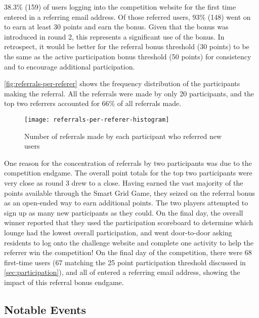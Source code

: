 38.3\% (159) of users logging into the competition website for the first time entered in a referring email address. Of those referred users, 93\% (148) went on to earn at least 30 points and earn the bonus. Given that the bonus was introduced in round 2, this represents a significant use of the bonus. In retrospect, it would be better for the referral bonus threshold (30 points) to be the same as the active participation bonus threshold (50 points) for consistency and to encourage additional participation.

\autoref{fig:referrals-per-referer} shows the frequency distribution of the participants making the referral. All the referrals were made by only 20 participants, and the top two referrers accounted for 66\% of all referrals made.

\begin{figure}[htbp]
	\centering
		\texttt{[image: referrals-per-referer-histogram]}
		\caption{Number of referrals made by each participant who referred new users}
\label{fig:referrals-per-referer}
\end{figure}

One reason for the concentration of referrals by two participants was due to the competition endgame. The overall point totals for the top two participants were very close as round 3 drew to a close. Having earned the vast majority of the points available through the Smart Grid Game, they seized on the referral bonus as an open-ended way to earn additional points. The two players attempted to sign up as many new participants as they could. On the final day, the overall winner reported that they used the participation scoreboard to determine which lounge had the lowest overall participation, and went door-to-door asking residents to log onto the challenge website and complete one activity to help the referrer win the competition! On the final day of the competition, there were 68 first-time users (67 matching the 25 point participation threshold discussed in \autoref{sec:participation}), and all of entered a referring email address, showing the impact of this referral bonus endgame.

\subsection{Notable Events}



